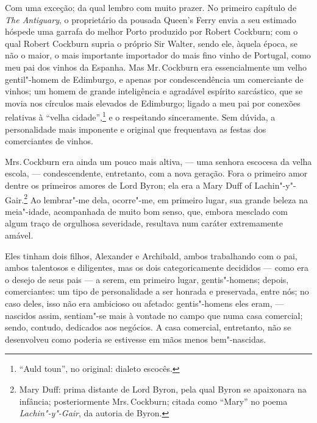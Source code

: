Com uma exceção; da qual lembro com muito prazer. No primeiro
capítulo de \textit{The Antiguary}, o proprietário da pousada Queen's
Ferry envia a seu estimado hóspede uma garrafa do melhor Porto produzido
por Robert Cockburn; com o qual Robert Cockburn supria o próprio Sir
Walter, sendo ele, àquela época, se não o maior, o mais importante
importador do mais fino vinho de Portugal, como meu pai dos vinhos da
Espanha. Mas Mr.\,Cockburn era essencialmente um velho gentil"-homem de
Edimburgo, e apenas por condescendência um comerciante de vinhos; um
homem de grande inteligência e agradável espírito sarcástico, que se
movia nos círculos mais elevados de Edimburgo; ligado a meu pai por
conexões relativas à ``velha cidade'',\footnote{``Auld toun'', no original:
  dialeto escocês.} e o respeitando sinceramente. Sem
dúvida, a personalidade mais imponente e original que frequentava as
festas dos comerciantes de vinhos.

Mrs.\,Cockburn era ainda um pouco mais altiva, --- uma senhora escocesa da
velha escola, --- condescendente, entretanto, com a nova geração. Fora o
primeiro amor dentre os primeiros amores de Lord Byron; ela era a Mary
Duff of Lachin"-y"-Gair.\footnote{Mary Duff: prima distante de Lord Byron,
  pela qual Byron se apaixonara na infância; posteriormente Mrs.\,Cockburn; citada como ``Mary'' no poema \textit{Lachin"-y"-Gair}, da
  autoria de Byron.} Ao lembrar"-me dela, ocorre"-me, em
primeiro lugar, sua grande beleza na meia"-idade, acompanhada de muito
bom senso, que, embora mesclado com algum traço de orgulhosa severidade,
resultava num caráter extremamente amável.

Eles tinham dois filhos, Alexander e Archibald, ambos trabalhando
com o pai, ambos talentosos e diligentes, mas os dois categoricamente
decididos --- como era o desejo de seus pais --- a serem, em primeiro
lugar, gentis"-homens; depois, comerciantes: um tipo de personalidade a
ser honrada e preservada, entre nós; no caso deles, isso não era
ambicioso ou afetado: gentis"-homens eles eram, --- nascidos assim,
sentiam"-se mais à vontade no campo que numa casa comercial; sendo,
contudo, dedicados aos negócios. A casa comercial, entretanto, não se
desenvolveu como poderia se estivesse em mãos menos bem"-nascidas.

